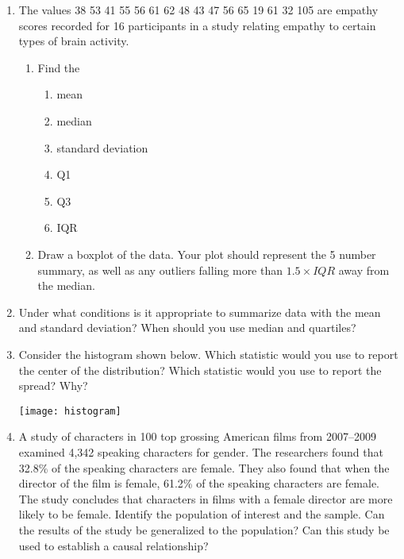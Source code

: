 \documentclass[11pt,fullpage]{amsart}
\begin{document}
\begin{enumerate}
\vfill

\item The values 38  53  41  55  56  61  62  48  43  47  56  65  19  61  32 105 are empathy scores recorded for 16 participants in a study relating empathy to certain types of brain activity.
  \begin{enumerate}
    \item Find the 

\begin{enumerate}
\item mean

\item median

\item standard deviation

\item Q1

\item Q3

  \item IQR

\end{enumerate}


\item Draw a boxplot of the data. Your plot should represent the 5 number summary, as well as any outliers falling more than $1.5\times IQR$ away from the median. 

  \end{enumerate}

\vfill
  
\item Under what conditions is it appropriate to summarize data with
  the mean and standard deviation?  When should you use median and quartiles?

\vfill
  
\item Consider the histogram shown below.  Which statistic would you
  use to report the center of the distribution?  Which statistic
  would you use to report the spread? Why?

\texttt{[image: histogram]}

\vfill

\item A study of characters in 100 top grossing American films from 2007--2009 examined 4,342 speaking characters for gender. The researchers found that 32.8\% of the speaking characters are female. They also found that when the director of the film is female, 61.2\% of the speaking characters are female. The study concludes that characters in films with a female director are more likely to be female. Identify the population of interest and the sample. Can the results of the study be generalized to the population? Can this study be used to establish a causal relationship?



\end{enumerate}
\end{document}
